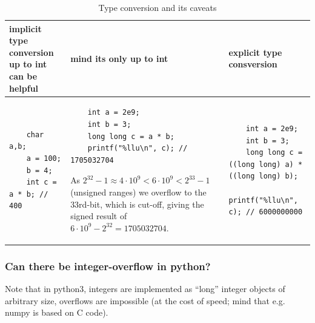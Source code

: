 \begin{table}[!htb]
    \centering
    \begin{tabular}{p{}|p{}|p{}}
        \textcolor{green1}{implicit type conversion up to int can be helpful} & \textcolor{red1}{mind its only up to int} & \textcolor{green1}{explicit type consversion} \\
        \hline
        \begin{minipage}[t]{0.3\textwidth}
        \begin{verbatim}
    char a,b;
    a = 100;
    b = 4;
    int c = a * b; // 400
        \end{verbatim}
        \end{minipage}
        &
        \begin{minipage}[t]{0.3\textwidth}
        \begin{verbatim}
    int a = 2e9;
    int b = 3;
    long long c = a * b;
    printf("%llu\n", c); // 1705032704
        \end{verbatim}
        As $2^{32} - 1 \approx 4\cdot 10^9 < 6 \cdot 10^9 < 2^{33} - 1$ (unsigned ranges) we overflow to the 33rd-bit, which is cut-off,
        giving the signed result of $6 \cdot 10^9 - 2^{32} = 1705032704$.
        \end{minipage}
        &
        \begin{minipage}[t]{0.3\textwidth}
        \begin{verbatim}
    int a = 2e9;
    int b = 3;
    long long c = ((long long) a) * ((long long) b);
    printf("%llu\n", c); // 6000000000            
        \end{verbatim}
        \end{minipage}
    \end{tabular}
    \caption{Type conversion and its caveats}
    \label{tab:type_conversion}
\end{table}

\subsubsection{Can there be integer-overflow in python?}
Note that in python3, integers are implemented as “long” integer objects of arbitrary size, overflows are
impossible (at the cost of speed; mind that e.g. numpy is based on C code).

